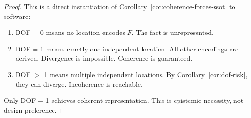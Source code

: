 \begin{proof}
This is a direct instantiation of Corollary~\ref{cor:coherence-forces-ssot} to software:
\begin{enumerate}
\item DOF = 0 means no location encodes $F$. The fact is unrepresented.
\item DOF = 1 means exactly one independent location. All other encodings are derived. Divergence is impossible. Coherence is guaranteed.
\item DOF $>$ 1 means multiple independent locations. By Corollary~\ref{cor:dof-risk}, they can diverge. Incoherence is reachable.
\end{enumerate}

Only DOF = 1 achieves coherent representation. This is epistemic necessity, not design preference.
\end{proof}


